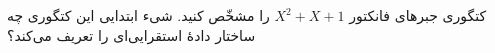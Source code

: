 کتگوری جبرهای فانکتور $X^2 + X + 1$ را مشخّص کنید. شیء ابتدایی این کتگوری چه ساختار داده‌ٔ استقرایی‌ای را تعریف می‌کند؟